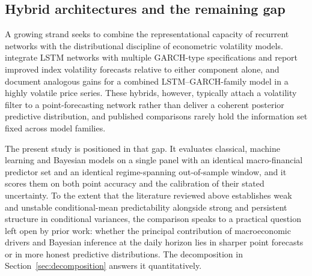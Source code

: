 \subsection{Hybrid architectures and the remaining gap}

A growing strand seeks to combine the representational capacity of recurrent
networks with the distributional discipline of econometric volatility models.
\citet{kim2018forecasting} integrate LSTM networks with multiple GARCH-type
specifications and report improved index volatility forecasts relative to either
component alone, and \citet{wang2022garlic} document analogous gains for a
combined LSTM--GARCH-family model in a highly volatile price series. These
hybrids, however, typically attach a volatility filter to a point-forecasting
network rather than deliver a coherent posterior predictive distribution, and
published comparisons rarely hold the information set fixed across model
families.

The present study is positioned in that gap. It evaluates classical, machine
learning and Bayesian models on a single panel with an identical macro-financial
predictor set and an identical regime-spanning out-of-sample window, and it
scores them on both point accuracy and the calibration of their stated
uncertainty. To the extent that the literature reviewed above establishes weak
and unstable conditional-mean predictability alongside strong and persistent
structure in conditional variances, the comparison speaks to a practical
question left open by prior work: whether the principal contribution of
macroeconomic drivers and Bayesian inference at the daily horizon lies in sharper
point forecasts or in more honest predictive distributions. The decomposition in
Section~\ref{sec:decomposition} answers it quantitatively.
